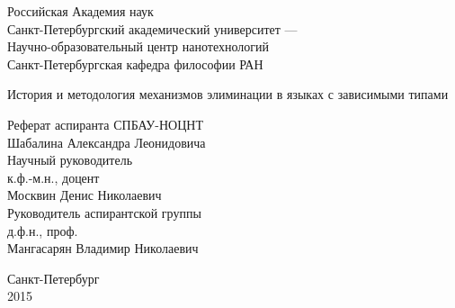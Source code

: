 \begin{titlepage}

\begin{center}
Российская Академия наук\\
Санкт-Петербургский академический университет ---\\
Научно-образовательный центр нанотехнологий\\[.5cm]
Санкт-Петербургская кафедра философии РАН
\end{center}

\vspace{2cm}

\begin{center}
История и методология механизмов элиминации в языках с зависимыми типами
\end{center}

\vspace{1cm}

\begin{flushright}
Реферат аспиранта СПБАУ-НОЦНТ\\
Шабалина Александра Леонидовича\\[.5cm]

Научный руководитель\\
к.ф.-м.н., доцент\\
Москвин Денис Николаевич\\[.5cm]

Руководитель аспирантской группы\\
д.ф.н., проф.\\
Мангасарян Владимир Николаевич
\end{flushright}

\vfill

\begin{center}
Санкт-Петербург\\
2015
\end{center}

\end{titlepage}
